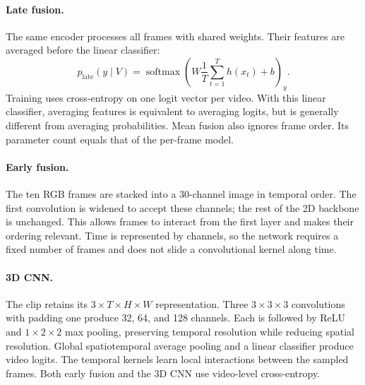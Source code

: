 \paragraph{Late fusion.}
The same encoder processes all frames with shared weights. Their features
are averaged before the linear classifier:
\begin{equation}
    p_{\mathrm{late}}(y\mid V)
    = \operatorname{softmax}\!\left(
        W\frac{1}{T}\sum_{t=1}^{T}h(x_t)+b\right)_y.
\end{equation}
Training uses cross-entropy on one logit vector per video. With this linear
classifier, averaging features is equivalent to averaging logits, but is
generally different from averaging probabilities. Mean fusion also ignores
frame order. Its parameter count equals that of the per-frame model.

\paragraph{Early fusion.}
The ten RGB frames are stacked into a 30-channel image in temporal order.
The first convolution is widened to accept these channels; the rest of the
2D backbone is unchanged. This allows frames to interact from the first
layer and makes their ordering relevant. Time is represented by channels,
so the network requires a fixed number of frames and does not slide a
convolutional kernel along time.

\paragraph{3D CNN.}
The clip retains its $3\times T\times H\times W$ representation. Three
$3\times3\times3$ convolutions with padding one produce 32, 64, and 128
channels. Each is followed by ReLU and $1\times2\times2$ max pooling,
preserving temporal resolution while reducing spatial resolution. Global
spatiotemporal average pooling and a linear classifier produce video logits.
The temporal kernels learn local interactions between the sampled frames.
Both early fusion and the 3D CNN use video-level cross-entropy.
